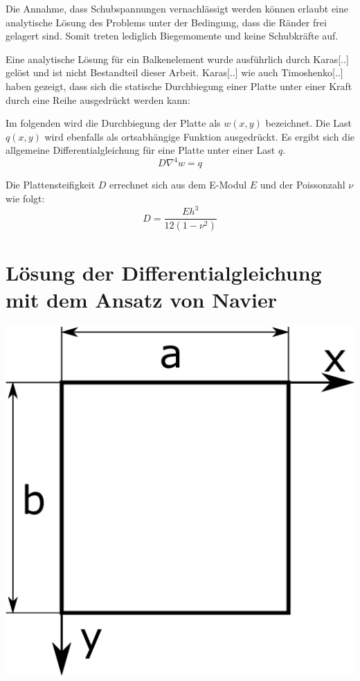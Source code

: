 Die Annahme, dass Schubspannungen vernachlässigt werden können erlaubt eine analytische Lösung des Problems unter der Bedingung, dass die Ränder frei gelagert sind. Somit treten lediglich Biegemomente und keine Schubkräfte auf.

Eine analytische Lösung für ein Balkenelement wurde ausführlich durch Karas[..] gelöst und ist nicht Bestandteil dieser Arbeit.
Karas[..] wie auch Timoshenko[..] haben gezeigt, dass sich die statische Durchbiegung einer Platte unter einer Kraft durch eine Reihe ausgedrückt werden kann:

Im folgenden wird die Durchbiegung der Platte als $w(x,y)$ bezeichnet. Die Last $q(x,y)$ wird ebenfalls als ortsabhängige Funktion ausgedrückt. 
Es ergibt sich die allgemeine Differentialgleichung für eine Platte unter einer Last $q$.
\begin{equation}
	D \nabla^4 w = q
\end{equation}

Die Plattensteifigkeit $D$ errechnet sich aus dem E-Modul $E$ und der Poissonzahl $\nu$ wie folgt:
\begin{equation}
D = \dfrac{E h^3}{12 (1-\nu^2)}
\end{equation}


\section{Lösung der Differentialgleichung mit dem Ansatz von Navier}

\begin{center}
	\includegraphics[scale=0.2]{pictures/theory/theory1.eps}
\end{center}

